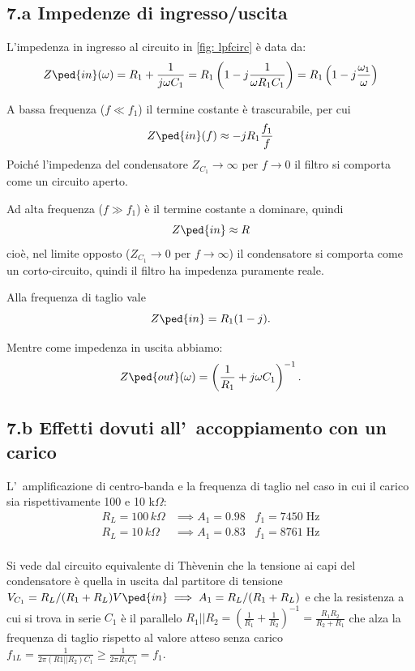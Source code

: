 \documentclass[10pt,a4paper]{article}
\begin{document}
\subsection*{7.a Impedenze di ingresso/uscita}
L'impedenza in ingresso al circuito in \ref{fig: lpfcirc} è data da:
\[
Z\ped{in}(\omega) = R_1 + \frac{1}{j \omega C_1} =
R_1 \left( 1 - j \frac{1}{\omega R_1 C_1} \right) =
R_1 \left( 1 - j \frac{\omega_1}{\omega} \right)
\]

A bassa frequenza ($f \ll f_1$) il termine costante è trascurabile, per cui
\[
Z\ped{in}(f) \approx -jR_1 \frac{f_1}{f}
\]
Poiché l'impedenza del condensatore $Z_{C_1} \to \infty$ per $f \to 0$
il filtro si comporta come un circuito aperto.

Ad alta frequenza ($f \gg f_1$) è il termine costante a dominare, quindi
\[
Z\ped{in} \approx R
\]
cioè, nel limite opposto ($Z_{C_1} \to 0$ per $f \to \infty$) il
condensatore si comporta come un corto-circuito, quindi il filtro ha
impedenza puramente reale.

Alla frequenza di taglio vale
\[
Z\ped{in} = R_1 (1 - j)
.\]

Mentre come impedenza in uscita abbiamo:
\[
Z\ped{out}(\omega) = \left(\frac{1}{R_1} + j\omega C_1\right)^{-1}
.\]

\subsection*{7.b Effetti dovuti all'~accoppiamento con un carico}
L'~amplificazione di centro-banda e la frequenza di taglio nel 
caso in cui il carico sia rispettivamente 100 e 10 k$\Omega$:
\[
\begin{array}{rl}
R_L=100 \,k\Omega & \implies A_1 = 0.98 \;\;\; f_1 = 7450 \; \si{\Hz} \\
R_L=10 \,k\Omega & \implies A_1 = 0.83\;\;\; f_1 = 8761 \; \si{\Hz} \\
\end{array}
\]

Si vede dal circuito equivalente di Thèvenin che la tensione ai capi del
condensatore è quella in uscita dal partitore di tensione
$V_{C_1} = R_L/(R_1 + R_L) V\ped{in} \implies A_1 = R_L/(R_1 + R_L)$ e che
la resistenza a cui si trova in serie $C_1$ è il parallelo $R_1 || R_2 =
(\frac{1}{R_1} + \frac{1}{R_2})^{-1} = \frac{R_1 R_2}{R_2 + R_1}$ che alza
la frequenza di taglio rispetto al valore atteso senza carico
$f_{1L} = \frac{1}{2\pi (R1 || R_2) C_1} \geq \frac{1}{2\pi R_1 C_1} = f_1$.

\end{document}
